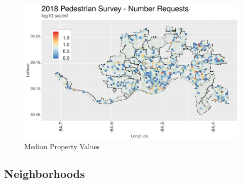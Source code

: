 \documentclass{llncs}
\begin{document}
%

\FloatBarrier
\begin{figure}
 	\includegraphics[width=\textwidth, height=\textheight, keepaspectratio]{pedestrianSurveyNRequests}
 	\caption{Median Property Values}
	\label{figure : pedestrianSurveyNRequests}
\end{figure}
\FloatBarrier


\subsection{Neighborhoods}
\end{document}
